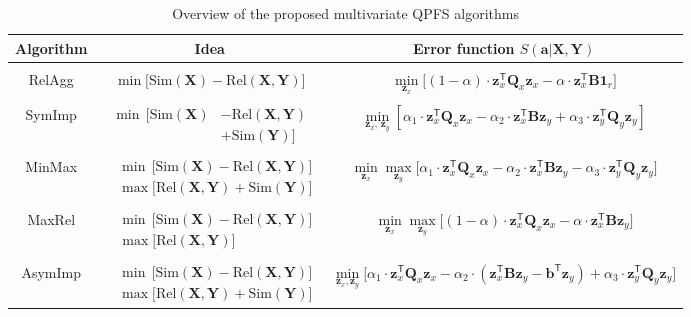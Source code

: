 \documentclass[12pt,oneside]{article}
\theoremstyle{definition}
\newcommand{\ba}{\mathbf{a}}
\newcommand{\bz}{\mathbf{z}}
\newcommand{\bb}{\mathbf{b}}
\newcommand{\bY}{\mathbf{Y}}
\newcommand{\bX}{\mathbf{X}}
\newcommand{\bB}{\mathbf{B}}
\newcommand{\bQ}{\mathbf{Q}}
\newcommand{\T}{\mathsf{T}}
\newcommand{\bOne}{\boldsymbol{1}}
\begin{document}
\begin{table}
	\centering
	\small{
	\begin{tabular}{c|c|c}
		\hline
		Algorithm & Idea & Error function $S(\ba | \bX, \bY)$ \\
		\hline && \\ [-.5em]
		RelAgg & $\min \bigl[ \text{Sim}(\bX) - \text{Rel}(\bX, \bY) \bigr] $ & $\min\limits_{\bz_x} \bigl[ (1 - \alpha) \cdot \bz_x^{\T} \bQ_x \bz_x - \alpha \cdot \bz_x^{\T} \bB \bOne_r \bigr] $ \\ &&\\[-.5em]
		SymImp & $\begin{aligned} \min \, \bigl[ \text{Sim}(\bX) & - \text{Rel}(\bX, \bY) \\ & + \text{Sim}(\bY) \bigr] \end{aligned}$ & $ \min\limits_{\bz_x, \, \bz_y} \left[ \alpha_1 \cdot \bz_x^{\T} \bQ_x \bz_x - \alpha_2 \cdot \bz_x^{\T} \bB \bz_y + \alpha_3 \cdot \bz_y^{\T} \bQ_y \bz_y \right] $\\ &&\\ [-.5em]
		MinMax & $\begin{aligned} &\min \, \bigl[ \text{Sim}(\bX) - \text{Rel}(\bX, \bY) \bigr]  \\ & \max \bigl[\text{Rel}(\bX, \bY) + \text{Sim}(\bY) \bigr] \end{aligned}$ & $	\min\limits_{\bz_x} 	\max\limits_{\bz_y} \bigl[\alpha_1 \cdot \bz_x^{\T} \bQ_x \bz_x - \alpha_2 \cdot \bz_x^{\T} \bB \bz_y - \alpha_3 \cdot \bz_y^{\T} \bQ_y \bz_y \bigr]$ \\ &&\\ 
		MaxRel & $\begin{aligned} &\min \, \bigl[ \text{Sim}(\bX) - \text{Rel}(\bX, \bY) \bigr]  \\ & \max \bigl[\text{Rel}(\bX, \bY) \bigr] \end{aligned}$& $\min\limits_{\bz_x} 	\max\limits_{\bz_y} \bigl[ (1 - \alpha) \cdot \bz_x^{\T} \bQ_x \bz_x - \alpha \cdot \bz_x^{\T} \bB \bz_y \bigr]$ \\ 		&&\\ [-.5em]
		AsymImp & $\begin{aligned} & \min \, \bigl[ \text{Sim}(\bX) - \text{Rel}(\bX, \bY) \bigr]\\ &  \max \bigl[\text{Rel}(\bX, \bY) + \text{Sim}(\bY) \bigr] \end{aligned}$ & $\min\limits_{\bz_x, \bz_y} \bigl[ \alpha_1 \cdot \bz_x^{\T} \bQ_x \bz_x - \alpha_2 \cdot \left(\bz_x^{\T} \bB \bz_y - \bb^{\T} \bz_y \right) + \alpha_3 \cdot \bz_y^{\T} \bQ_y \bz_y \bigr]$\\ 
		\hline
	\end{tabular}}
	\caption{Overview of the proposed multivariate QPFS algorithms}
	\label{tbl:summary}
\end{table}
\end{document}
